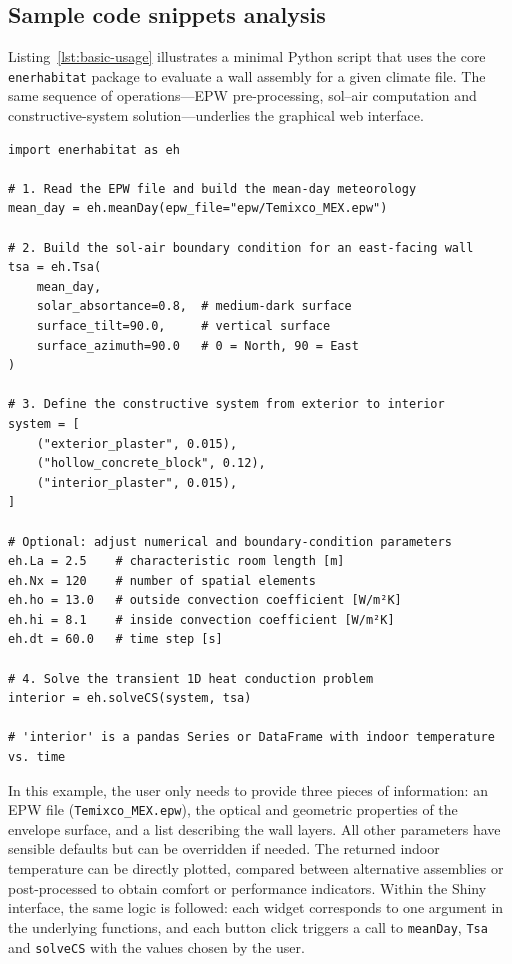 \documentclass[preprint,12pt, a4paper]{elsarticle}
\begin{document}
\subsection{Sample code snippets analysis}

Listing~\ref{lst:basic-usage} illustrates a minimal Python script that uses the core \texttt{enerhabitat} package to evaluate a wall assembly for a given climate file. The same sequence of operations---EPW pre-processing, sol--air computation and constructive-system solution---underlies the graphical web interface.

\begin{verbatim}
import enerhabitat as eh

# 1. Read the EPW file and build the mean-day meteorology
mean_day = eh.meanDay(epw_file="epw/Temixco_MEX.epw")

# 2. Build the sol-air boundary condition for an east-facing wall
tsa = eh.Tsa(
    mean_day,
    solar_absortance=0.8,  # medium-dark surface
    surface_tilt=90.0,     # vertical surface
    surface_azimuth=90.0   # 0 = North, 90 = East
)

# 3. Define the constructive system from exterior to interior
system = [
    ("exterior_plaster", 0.015),
    ("hollow_concrete_block", 0.12),
    ("interior_plaster", 0.015),
]

# Optional: adjust numerical and boundary-condition parameters
eh.La = 2.5    # characteristic room length [m]
eh.Nx = 120    # number of spatial elements
eh.ho = 13.0   # outside convection coefficient [W/m²K]
eh.hi = 8.1    # inside convection coefficient [W/m²K]
eh.dt = 60.0   # time step [s]

# 4. Solve the transient 1D heat conduction problem
interior = eh.solveCS(system, tsa)

# 'interior' is a pandas Series or DataFrame with indoor temperature vs. time
\end{verbatim}

In this example, the user only needs to provide three pieces of information: an EPW file (\texttt{Temixco\_MEX.epw}), the optical and geometric properties of the envelope surface, and a list describing the wall layers. All other parameters have sensible defaults but can be overridden if needed. The returned indoor temperature can be directly plotted, compared between alternative assemblies or post-processed to obtain comfort or performance indicators. Within the Shiny interface, the same logic is followed: each widget corresponds to one argument in the underlying functions, and each button click triggers a call to \texttt{meanDay}, \texttt{Tsa} and \texttt{solveCS} with the values chosen by the user.
\end{document}
